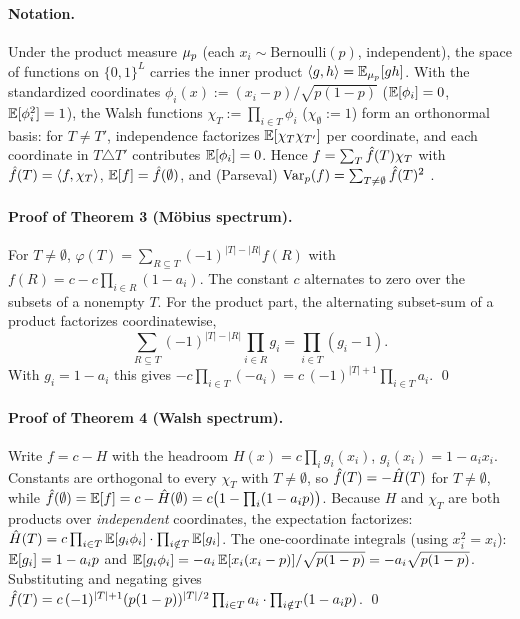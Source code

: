 \paragraph{Notation.} Under the product measure $\mu_p$ (each $x_i \sim \mathrm{Bernoulli}(p)$,
independent), the space of functions on $\{0,1\}^L$ carries the inner product
$\langle g,h\rangle = \mathbb{E}_{\mu_p}[gh]$. With the standardized coordinates
$\phi_i(x) := (x_i-p)/\sqrt{p(1-p)}$ ($\mathbb{E}[\phi_i]=0$, $\mathbb{E}[\phi_i^2]=1$), the Walsh functions
$\chi_T := \prod_{i\in T}\phi_i$ ($\chi_\emptyset := 1$) form an orthonormal basis: for $T\ne T'$,
independence factorizes $\mathbb{E}[\chi_T\chi_{T'}]$ per coordinate, and each coordinate in $T\triangle T'$
contributes $\mathbb{E}[\phi_i]=0$. Hence $f = \sum_T \hat f(T)\chi_T$ with $\hat f(T)=\langle f,\chi_T\rangle$,
$\mathbb{E}[f]=\hat f(\emptyset)$, and (Parseval) $\operatorname{Var}_p(f) = \sum_{T\ne\emptyset} \hat f(T)^2$
\citep{odonnell2014boolean}.

\paragraph{Proof of Theorem 3 (M\"obius spectrum).} For $T\ne\emptyset$,
$\varphi(T) = \sum_{R\subseteq T}(-1)^{|T|-|R|} f(R)$ with $f(R) = c - c\prod_{i\in R}(1-a_i)$. The
constant $c$ alternates to zero over the subsets of a nonempty $T$. For the product part, the alternating
subset-sum of a product factorizes coordinatewise,
\[
\sum_{R\subseteq T}(-1)^{|T|-|R|}\prod_{i\in R}g_i = \prod_{i\in T}(g_i-1).
\]
With $g_i = 1-a_i$ this gives
$-c\prod_{i\in T}(-a_i) = c\,(-1)^{|T|+1}\prod_{i\in T}a_i$. \qed

\paragraph{Proof of Theorem 4 (Walsh spectrum).} Write $f = c - H$ with the headroom
$H(x) = c\prod_i g_i(x_i)$, $g_i(x_i) = 1 - a_i x_i$. Constants are orthogonal to every $\chi_T$ with
$T\ne\emptyset$, so $\hat f(T) = -\hat H(T)$ for $T\ne\emptyset$, while
$\hat f(\emptyset) = \mathbb{E}[f] = c - \hat H(\emptyset) = c\bigl(1-\prod_i(1-a_ip)\bigr)$. Because $H$ and $\chi_T$ are both products over
\emph{independent} coordinates, the expectation factorizes:
$\hat H(T) = c\prod_{i\in T}\mathbb{E}[g_i\phi_i]\cdot\prod_{i\notin T}\mathbb{E}[g_i]$. The one-coordinate integrals
(using $x_i^2=x_i$): $\mathbb{E}[g_i] = 1-a_ip$ and
$\mathbb{E}[g_i\phi_i] = -a_i\,\mathbb{E}[x_i(x_i-p)]/\sqrt{p(1-p)} = -a_i\sqrt{p(1-p)}$. Substituting and negating gives
$\hat f(T) = c\,(-1)^{|T|+1}(p(1-p))^{|T|/2}\prod_{i\in T}a_i\cdot\prod_{i\notin T}(1-a_ip)$. \qed



